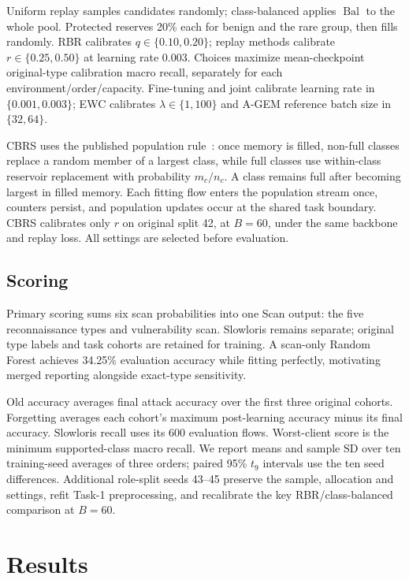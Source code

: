 \documentclass[journal,10pt]{IEEEtran}
\begin{document}
Uniform replay samples candidates randomly; class-balanced applies $\operatorname{Bal}$ to the whole pool. Protected reserves 20\% each for benign and the rare group, then fills randomly. RBR calibrates $q\in\{0.10,0.20\}$; replay methods calibrate $r\in\{0.25,0.50\}$ at learning rate 0.003. Choices maximize mean-checkpoint original-type calibration macro recall, separately for each environment/order/capacity. Fine-tuning and joint calibrate learning rate in $\{0.001,0.003\}$; EWC calibrates $\lambda\in\{1,100\}$ and A-GEM reference batch size in $\{32,64\}$.

CBRS uses the published population rule~\cite{cbrs}: once memory is filled, non-full classes replace a random member of a largest class, while full classes use within-class reservoir replacement with probability $m_c/n_c$. A class remains full after becoming largest in filled memory. Each fitting flow enters the population stream once, counters persist, and population updates occur at the shared task boundary. CBRS calibrates only $r$ on original split 42, at $B=60$, under the same backbone and replay loss. All settings are selected before evaluation.

\subsection{Scoring}
Primary scoring sums six scan probabilities into one Scan output: the five reconnaissance types and vulnerability scan. Slowloris remains separate; original type labels and task cohorts are retained for training. A scan-only Random Forest achieves 34.25\% evaluation accuracy while fitting perfectly, motivating merged reporting alongside exact-type sensitivity.

Old accuracy averages final attack accuracy over the first three original cohorts. Forgetting averages each cohort's maximum post-learning accuracy minus its final accuracy. Slowloris recall uses its 600 evaluation flows. Worst-client score is the minimum supported-class macro recall. We report means and sample SD over ten training-seed averages of three orders; paired 95\% $t_9$ intervals use the ten seed differences. Additional role-split seeds 43--45 preserve the sample, allocation and settings, refit Task-1 preprocessing, and recalibrate the key RBR/class-balanced comparison at $B=60$.

\section{Results}


\end{document}
